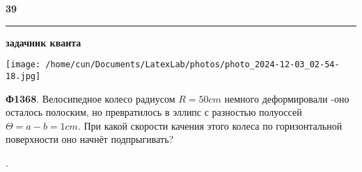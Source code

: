 \pagestyle{fancy}
\fancyhf{}
\renewcommand{\headrulewidth}{0pt}
\begin{center}
    {\LARGE\bfseries 39}
    \vspace{-0.5em}
    \rule{\textwidth}{0.2pt}
    {\textbf {задачник кванта}}
\end{center}




\begin{multicols}{2}

    \begin{center}
        \texttt{[image: /home/cun/Documents/LatexLab/photos/photo\_2024-12-03\_02-54-18.jpg]}
    \end{center}
\raggedleft
\textbf{Ф1368}. Велосипедное колесо радиусом \(R = 50cm\) немного деформировали
-оно осталось полоским, но превратилось в эллипс с разностью полуоссей \(\Theta = a - b = 1cm\).
При какой скорости качения этого колеса по горизонтальной поверхности оно начнёт подпрыгивать?

\columnbreak
\raggedright
.

\end{multicols}